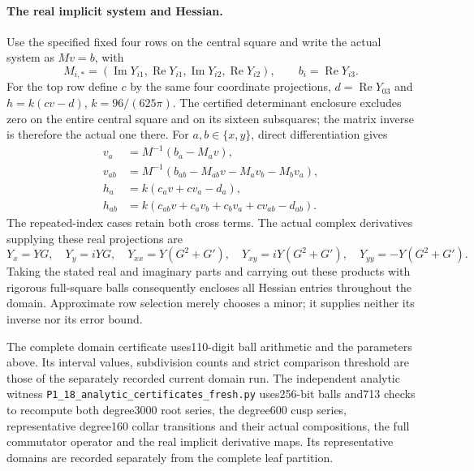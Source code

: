 \paragraph{The real implicit system and Hessian.}
Use the specified fixed four rows on the central square and
write the actual system as $Mv=b$, with
\[
 M_{i,*}=(\operatorname{Im}Y_{i1},\operatorname{Re}Y_{i1},
          \operatorname{Im}Y_{i2},\operatorname{Re}Y_{i2}),
 \qquad b_i=\operatorname{Re}Y_{i3}.
\]
For the top row define $c$ by the same four coordinate projections,
$d=\operatorname{Re}Y_{03}$ and $h=k(cv-d)$,
$k=96/(625\pi)$. The certified determinant enclosure excludes
zero on the entire central square and on its sixteen subsquares;
the matrix inverse is therefore the actual one there.
For $a,b\in\{x,y\}$, direct differentiation gives
\[
 \begin{split}
 v_a&=M^{-1}(b_a-M_av),\\
 v_{ab}&=M^{-1}(b_{ab}-M_{ab}v-M_av_b-M_bv_a),\\
 h_a&=k(c_av+cv_a-d_a),\\
 h_{ab}&=k(c_{ab}v+c_av_b+c_bv_a+cv_{ab}-d_{ab}).
 \end{split}
\]
The repeated-index cases retain both cross terms. The actual
complex derivatives supplying these real projections are
\[
 Y_x=YG,\quad Y_y=iYG,\quad
 Y_{xx}=Y(G^2+G'),\quad Y_{xy}=iY(G^2+G'),\quad
 Y_{yy}=-Y(G^2+G').
\]
Taking the stated real and imaginary parts and carrying out these
products with rigorous full-square balls consequently encloses
all Hessian entries throughout the domain. Approximate row
selection merely chooses a minor; it supplies neither its inverse
nor its error bound.

The complete domain certificate uses110-digit ball arithmetic and
the parameters above. Its interval values, subdivision counts and
strict comparison threshold are those of the separately recorded
current domain run. The independent analytic witness
\texttt{P1\_18\_analytic\_certificates\_fresh.py} uses256-bit balls
and713 checks to recompute both degree3000 root series, the
degree600 cusp series, representative degree160 collar
transitions and their actual compositions, the full commutator
operator and the real implicit derivative maps. Its representative
domains are recorded separately from the complete leaf partition.
